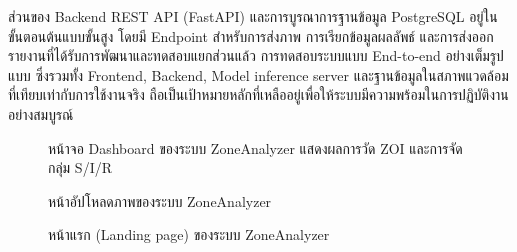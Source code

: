 ส่วนของ Backend REST API (FastAPI) และการบูรณาการฐานข้อมูล PostgreSQL อยู่ในขั้นตอนต้นแบบขั้นสูง โดยมี Endpoint สำหรับการส่งภาพ การเรียกข้อมูลผลลัพธ์ และการส่งออกรายงานที่ได้รับการพัฒนาและทดสอบแยกส่วนแล้ว การทดสอบระบบแบบ End-to-end อย่างเต็มรูปแบบ ซึ่งรวมทั้ง Frontend, Backend, Model inference server และฐานข้อมูลในสภาพแวดล้อมที่เทียบเท่ากับการใช้งานจริง ถือเป็นเป้าหมายหลักที่เหลืออยู่เพื่อให้ระบบมีความพร้อมในการปฏิบัติงานอย่างสมบูรณ์

\begin{figure}[H]
  \centering
  \caption{หน้าจอ Dashboard ของระบบ ZoneAnalyzer แสดงผลการวัด ZOI และการจัดกลุ่ม S/I/R}
  \label{fig:webapp}
\end{figure}

\begin{figure}[H]
  \centering
  \caption{หน้าอัปโหลดภาพของระบบ ZoneAnalyzer}
  \label{fig:webapp_upload}
\end{figure}

\begin{figure}[H]
  \centering
  \caption{หน้าแรก (Landing page) ของระบบ ZoneAnalyzer}
  \label{fig:webapp_home}
\end{figure}
